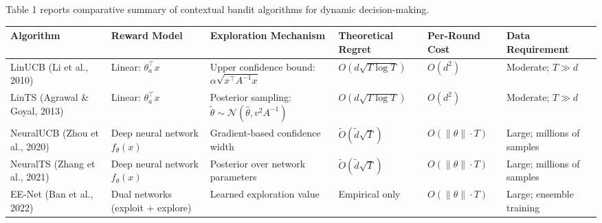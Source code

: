 Table 1 reports comparative summary of contextual bandit algorithms for dynamic decision-making.

\label{tab:3.1}

{\def\LTcaptype{none} %
\begin{longtable}[]{@{}
  >{\raggedright\arraybackslash}p{}
  >{\raggedright\arraybackslash}p{}
  >{\raggedright\arraybackslash}p{}
  >{\raggedright\arraybackslash}p{}
  >{\raggedright\arraybackslash}p{}
  >{\raggedright\arraybackslash}p{}@{}}
\toprule\noalign{}
\begin{minipage}[b]{\linewidth}\raggedright
Algorithm
\end{minipage} & \begin{minipage}[b]{\linewidth}\raggedright
Reward Model
\end{minipage} & \begin{minipage}[b]{\linewidth}\raggedright
Exploration Mechanism
\end{minipage} & \begin{minipage}[b]{\linewidth}\raggedright
Theoretical Regret
\end{minipage} & \begin{minipage}[b]{\linewidth}\raggedright
Per-Round Cost
\end{minipage} & \begin{minipage}[b]{\linewidth}\raggedright
Data Requirement
\end{minipage} \\
\midrule\noalign{}
\endhead
\bottomrule\noalign{}
\endlastfoot
LinUCB (Li et al., 2010) & Linear: \(\theta_a^\top x\) & Upper confidence bound: \(\alpha \sqrt{x^\top A^{-1} x}\) & \(O(d\sqrt{T \log T})\) & \(O(d^2)\) & Moderate; \(T \gg d\) \\
LinTS (Agrawal \& Goyal, 2013) & Linear: \(\theta_a^\top x\) & Posterior sampling: \(\tilde\theta \sim \mathcal{N}(\hat\theta, v^2 A^{-1})\) & \(O(d\sqrt{T \log T})\) & \(O(d^2)\) & Moderate; \(T \gg d\) \\
NeuralUCB (Zhou et al., 2020) & Deep neural network \(f_\theta(x)\) & Gradient-based confidence width & \(\tilde{O}(\tilde{d}\sqrt{T})\) & \(O(\|\theta\| \cdot T)\) & Large; millions of samples \\
NeuralTS (Zhang et al., 2021) & Deep neural network \(f_\theta(x)\) & Posterior over network parameters & \(\tilde{O}(\tilde{d}\sqrt{T})\) & \(O(\|\theta\| \cdot T)\) & Large; millions of samples \\
EE-Net (Ban et al., 2022) & Dual networks (exploit + explore) & Learned exploration value & Empirical only & \(O(\|\theta\| \cdot T)\) & Large; ensemble training \\
\end{longtable}
}

